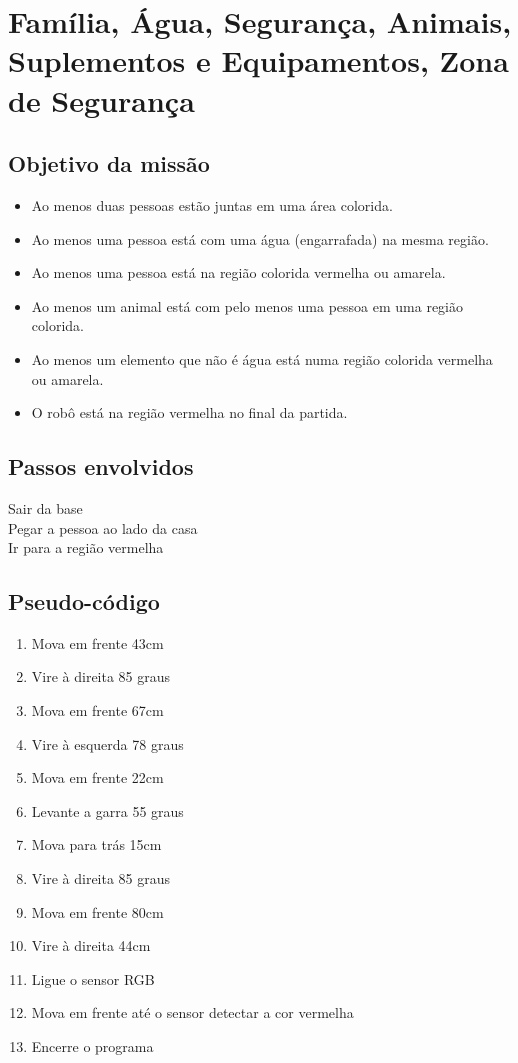 \documentclass[12pt,a4paper]{article}
\begin{document}
\newpage
\section{Família, Água, Segurança, Animais, Suplementos e Equipamentos, Zona de 
Segurança}
	\subsection{Objetivo da missão}
		\begin{itemize}
			\item Ao menos duas pessoas estão juntas em uma área colorida.
			\item Ao menos uma pessoa está com uma água (engarrafada) na mesma 
			região.
			\item Ao menos uma pessoa está na região colorida vermelha ou 
			amarela.
			\item Ao menos um animal está com pelo menos uma pessoa em uma 
			região colorida.
			\item Ao menos um elemento que não é água está numa região colorida 
			vermelha ou amarela.
			\item O robô está na região vermelha no final da partida.
		\end{itemize}

	\subsection{Passos envolvidos}
		Sair da base\\
		Pegar a pessoa ao lado da casa\\
		Ir para a região vermelha\\

	\subsection{Pseudo-código}
		\begin{enumerate}
			\item Mova em frente 43cm
			\item Vire à direita 85 graus
			\item Mova em frente 67cm
			\item Vire à esquerda 78 graus
			\item Mova em frente 22cm
			\item Levante a garra 55 graus
			\item Mova para trás 15cm
			\item Vire à direita 85 graus
			\item Mova em frente 80cm
			\item Vire à direita 44cm
			\item Ligue o sensor RGB
			\item Mova em frente até o sensor detectar a cor vermelha
			\item Encerre o programa
		\end{enumerate}
\end{document}
